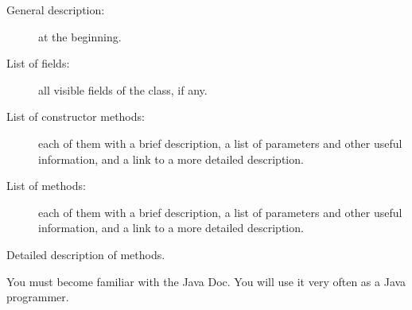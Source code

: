 \begin{description}
\item[General description: ] at the beginning.
\item[List of fields: ] all visible fields of the class, if any.
\item[List of constructor methods: ] each of them with a brief
  description, a list of parameters and other useful information, and
  a link to a more detailed description.
\item[List of methods: ] each of them with a brief
  description, a list of parameters and other useful information, and
  a link to a more detailed description.
\item[Detailed description of methods. ] 
\end{description}

You must become familiar with the Java Doc. You will use it very often
as a Java programmer. 




